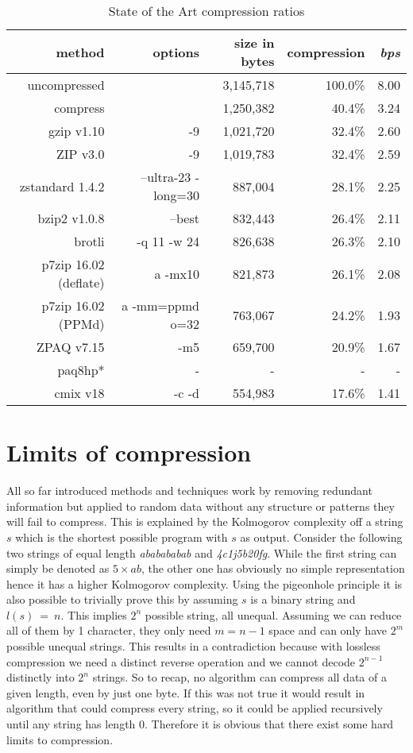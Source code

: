 {	\begin{table}[h]
		\begin{tabular}{r|r|r|r|r}
			method & options &  size in bytes & compression & \textit{bps}\\
			\hline
			uncompressed & & 3,145,718 & 100.0\% & 8.00 \\
			compress & & 1,250,382 & 40.4\% & 3.24 \\
			gzip v1.10 & -9 & 1,021,720 & 32.4\% & 2.60\\
			ZIP v3.0 &-9& 1,019,783 & 32.4\% & 2.59 \\
			zstandard 1.4.2& --ultra-23 -long=30 & 887,004 & 28.1\% & 2.25\\
			bzip2 v1.0.8 & --best & 832,443 & 26.4\% & 2.11 \\
			brotli & -q 11 -w 24 & 826,638 & 26.3\%& 2.10\\
			p7zip 16.02 (deflate) & a -mx10 & 821,873 & 26.1\% & 2.08 \\
			p7zip 16.02 (PPMd) & a -mm=ppmd o=32 & 763,067& 24.2\% & 1.93 \\
			ZPAQ v7.15 & -m5 & 659,700 & 20.9\% & 1.67  \\
			paq8hp* & - & - & - & - \\
			cmix v18 & -c -d & 554,983 & 17.6\% & 1.41 		
		\end{tabular}
				\label{tab:t20 stat of the art}
			\caption{State of the Art compression ratios}
	\end{table}
}

\section{Limits of compression}
\label{ch:Principles of compression:sec:Limits of Conpression}
\par{
All so far introduced methods and techniques work by removing redundant information but applied to random data without any structure or patterns they will fail to compress. This is explained by the Kolmogorov complexity\cite{kolmogorov} off a string $s$ which is the shortest possible program with $s$ as output. Consider the following two strings of equal length \textit{ababababab} and \textit{4c1j5b20fg}. While the first string can simply be denoted as $5 \times ab$, the other one has obviously no simple representation hence it has a higher Kolmogorov complexity. Using the pigeonhole principle it is also possible to trivially prove this by assuming $s$ is a binary string and $l(s) \: = \: n$. This implies $2^n$ possible string, all unequal. Assuming we can reduce all of them by 1 character, they only need $m = n - 1$ space and can only have $2^m$ possible unequal strings. This results in a contradiction because with lossless compression we need a distinct reverse operation and we cannot decode $2^{n-1}$ distinctly into $2^n$ strings. So to recap, no algorithm can compress all data of a given length, even by just one byte. If this was not true it would result in algorithm that could compress every string, so it could be applied recursively until any string has length 0. Therefore it is obvious that there exist some hard limits to compression.
}
